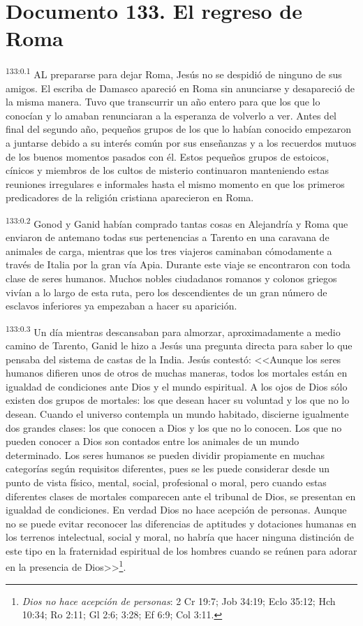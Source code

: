 \chapter{Documento 133. El regreso de Roma}
\par 
\textsuperscript{133:0.1} AL prepararse para dejar Roma, Jesús no se despidió de ninguno de sus amigos. El escriba de Damasco apareció en Roma sin anunciarse y desapareció de la misma manera. Tuvo que transcurrir un año entero para que los que lo conocían y lo amaban renunciaran a la esperanza de volverlo a ver. Antes del final del segundo año, pequeños grupos de los que lo habían conocido empezaron a juntarse debido a su interés común por sus enseñanzas y a los recuerdos mutuos de los buenos momentos pasados con él. Estos pequeños grupos de estoicos, cínicos y miembros de los cultos de misterio continuaron manteniendo estas reuniones irregulares e informales hasta el mismo momento en que los primeros predicadores de la religión cristiana aparecieron en Roma.

\par 
\textsuperscript{133:0.2} Gonod y Ganid habían comprado tantas cosas en Alejandría y Roma que enviaron de antemano todas sus pertenencias a Tarento en una caravana de animales de carga, mientras que los tres viajeros caminaban cómodamente a través de Italia por la gran vía Apia. Durante este viaje se encontraron con toda clase de seres humanos. Muchos nobles ciudadanos romanos y colonos griegos vivían a lo largo de esta ruta, pero los descendientes de un gran número de esclavos inferiores ya empezaban a hacer su aparición.

\par 
\textsuperscript{133:0.3} Un día mientras descansaban para almorzar, aproximadamente a medio camino de Tarento, Ganid le hizo a Jesús una pregunta directa para saber lo que pensaba del sistema de castas de la India. Jesús contestó: <<Aunque los seres humanos difieren unos de otros de muchas maneras, todos los mortales están en igualdad de condiciones ante Dios y el mundo espiritual. A los ojos de Dios sólo existen dos grupos de mortales: los que desean hacer su voluntad y los que no lo desean. Cuando el universo contempla un mundo habitado, discierne igualmente dos grandes clases: los que conocen a Dios y los que no lo conocen. Los que no pueden conocer a Dios son contados entre los animales de un mundo determinado. Los seres humanos se pueden dividir propiamente en muchas categorías según requisitos diferentes, pues se les puede considerar desde un punto de vista físico, mental, social, profesional o moral, pero cuando estas diferentes clases de mortales comparecen ante el tribunal de Dios, se presentan en igualdad de condiciones. En verdad Dios no hace acepción de personas. Aunque no se puede evitar reconocer las diferencias de aptitudes y dotaciones humanas en los terrenos intelectual, social y moral, no habría que hacer ninguna distinción de este tipo en la fraternidad espiritual de los hombres cuando se reúnen para adorar en la presencia de Dios>>\footnote{\textit{Dios no hace acepción de personas}: 2 Cr 19:7; Job 34:19; Eclo 35:12; Hch 10:34; Ro 2:11; Gl 2:6; 3:28; Ef 6:9; Col 3:11.}.

